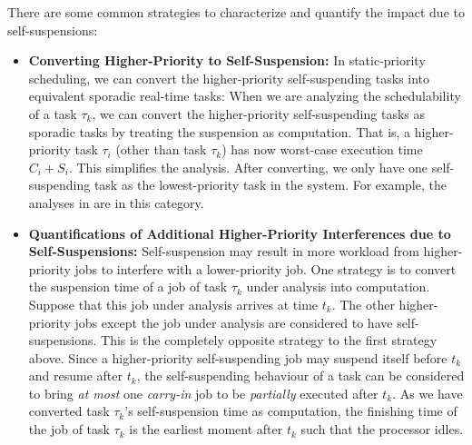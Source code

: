 There are some common strategies to characterize and quantify the impact due to self-suspensions:
\begin{itemize}
\item {\bf Converting Higher-Priority to Self-Suspension:} In static-priority scheduling, we can convert the higher-priority self-suspending tasks into equivalent sporadic real-time tasks: When we are analyzing the schedulability of a task $\tau_k$, we can convert the higher-priority self-suspending tasks as sporadic tasks by treating the suspension as computation. That is, a higher-priority task $\tau_i$ (other than task $\tau_k$) has now worst-case execution time $C_i+S_i$. This simplifies the analysis. After converting, we only have one self-suspending task as the lowest-priority task in the system. For example, the analyses in \cite{LR:rtas10,ecrts15nelissen} are in this category.
\item {\bf Quantifications of Additional Higher-Priority Interferences due to Self-Suspensions:} Self-suspension may result in more workload from higher-priority jobs to interfere with a lower-priority job. One strategy is to convert the suspension time of a job of task $\tau_k$ under analysis into computation. Suppose that this job under analysis arrives at time $t_k$. The other higher-priority jobs except the job under analysis are considered to have self-suspensions. This is the completely opposite strategy to the first strategy above. Since a higher-priority self-suspending job may suspend itself before $t_k$ and resume after $t_k$, the self-suspending behaviour of a task can be considered to bring \emph{at most} one \emph{carry-in} job to be \emph{partially} executed after $t_k$. As we have converted task $\tau_k$'s self-suspension time as computation, the finishing time of the job of task $\tau_k$ is the earliest moment after $t_k$ such that the processor idles. 
\begin{itemize}

\end{itemize}
\end{itemize}
